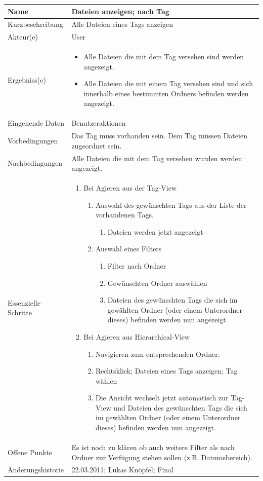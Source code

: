 \documentclass[10pt,paper=a4,final]{scrartcl}
\begin{document}
\begin{tabularx}{\textwidth}{|l|X|}
\hline
\bf Name & {\bf Dateien anzeigen; nach Tag} \\ \hline
Kurzbeschreibung & 	Alle Dateien eines Tags anzeigen \\ \hline
Akteur(e) & User \\ \hline
Ergebniss(e) & 	\begin{itemize}
	\item Alle Dateien die mit dem Tag versehen sind werden angezeigt.
	\item Alle Dateien die mit einem Tag versehen sind und sich innerhalb eines bestimmten Ordners befinden werden angezeigt.
\end{itemize} \\ \hline
Eingehende Daten & Benutzeraktionen \\ \hline
Vorbedingungen & Das Tag muss vorhanden sein. Dem Tag m\"ussen Dateien zugeordnet sein. \\ \hline
Nachbedingungen & Alle Dateien die mit dem Tag versehen wurden werden angezeigt. \\ \hline
Essenzielle Schritte & \begin{enumerate}
	\item Bei Agieren aus der Tag-View
	\begin{enumerate}
		\item Auswahl des gew\"unschten Tags aus der Liste der vorhandenen Tags.
		\begin{enumerate}
			\item Dateien werden jetzt angezeigt
		\end{enumerate}
		\item Auswahl eines Filters
		\begin{enumerate}
			\item Filter nach Ordner
			\item Gew\"unschten Ordner ausw\"ahlen
			\item Dateien des gew\"unschten Tags die sich im gew\"ahlten Ordner (oder einem Unterordner dieses) befinden werden nun angezeigt
		\end{enumerate}
	\end{enumerate}
	\item Bei Agieren aus Hierarchical-View
	\begin{enumerate}
		\item Navigieren zum entsprechenden Ordner.
		\item Rechtsklick; Dateien eines Tags anzeigen; Tag w\"ahlen
		\item Die Ansicht wechselt jetzt automatisch zur Tag-View und Dateien des gew\"unschten Tags die sich im gew\"ahlten Ordner (oder einem Unterordner dieses) befinden werden nun angezeigt.
	\end{enumerate}
\end{enumerate} \\ \hline
Offene Punkte & Es ist noch zu kl\"aren ob auch weitere Filter als nach Ordner zur Verf\"ugung stehen sollen (z.B. Datumsbereich). \\ \hline
\"Anderungshistorie &  22.03.2011; Lukas Knöpfel; Final \\ \hline
\end{tabularx}
\end{document}
